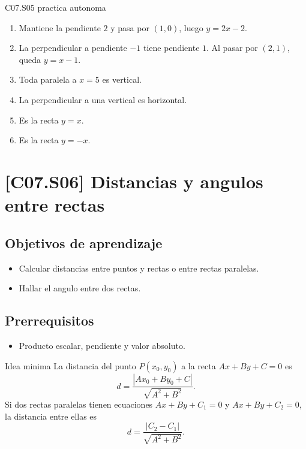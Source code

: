 \begin{fullsolution}{C07.S05 practica autonoma}
\begin{enumerate}[label=\textbf{PX-C07.S05-\arabic*:}, leftmargin=*]
  \item Mantiene la pendiente \(2\) y pasa por \((1,0)\), luego \(y=2x-2\).
  \item La perpendicular a pendiente \(-1\) tiene pendiente \(1\). Al pasar por \((2,1)\),
  queda \(y=x-1\).
  \item Toda paralela a \(x=5\) es vertical.
  \item La perpendicular a una vertical es horizontal.
  \item Es la recta \(y=x\).
  \item Es la recta \(y=-x\).
\end{enumerate}
\end{fullsolution}

\section{[C07.S06] Distancias y angulos entre rectas}

\subsection*{Objetivos de aprendizaje}
\begin{itemize}
  \item Calcular distancias entre puntos y rectas o entre rectas paralelas.
  \item Hallar el angulo entre dos rectas.
\end{itemize}

\subsection*{Prerrequisitos}
\begin{itemize}
  \item Producto escalar, pendiente y valor absoluto.
\end{itemize}

\begin{theorybox}{Idea minima}
La distancia del punto \(P(x_0,y_0)\) a la recta \(Ax+By+C=0\) es
\[
d=\frac{|Ax_0+By_0+C|}{\sqrt{A^2+B^2}}.
\]
Si dos rectas paralelas tienen ecuaciones \(Ax+By+C_1=0\) y \(Ax+By+C_2=0\), la distancia entre
ellas es
\[
d=\frac{|C_2-C_1|}{\sqrt{A^2+B^2}}.
\]
\end{theorybox}

